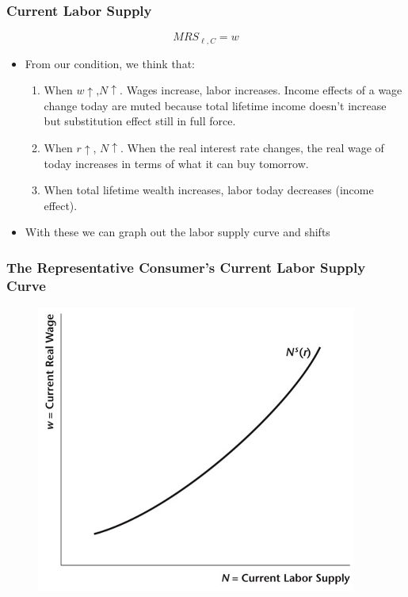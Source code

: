 \documentclass{beamer}
\begin{document}
\begin{frame}
\frametitle[alignment=center]{Current Labor Supply}
$$MRS_{\ell,C}=w$$
\begin{itemize}
\item From our condition, we think that:
\begin{enumerate}
\item When $w\uparrow$,$N\uparrow$.  Wages increase, labor increases.  Income effects of a wage change today are muted because total lifetime income doesn't increase but substitution effect still in full force.
\item When $r\uparrow$, $N\uparrow$.  When the real interest rate changes, the real wage of today increases in terms of what it can buy tomorrow.
\item When total lifetime wealth increases, labor today decreases (income effect).
\end{enumerate}
\item With these we can graph out the labor supply curve and shifts
\end{itemize}
\end{frame}


\begin{frame}
\frametitle[alignment=center]{The Representative Consumer's Current Labor Supply Curve}
\begin{figure}
\centering
\includegraphics[scale=0.6]{Figures/W_Fig_11pt1.png}
\end{figure}
\end{frame}
\end{document}
